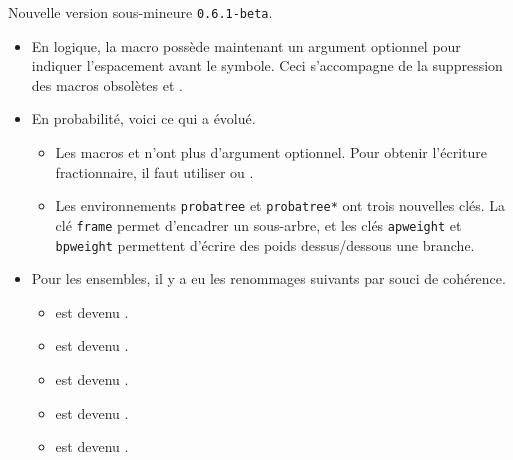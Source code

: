 Nouvelle version sous-mineure \verb+0.6.1-beta+.

\begin{itemize}[itemsep=.5em]
    \item En logique, la macro  possède maintenant un argument optionnel pour indiquer l'espacement avant le symbole.
          Ceci s'accompagne de la suppression des macros obsolètes  et .


    \item En probabilité, voici ce qui a évolué.
    \begin{itemize}[itemsep=.5em]
        \item Les macros  et  n'ont plus d'argument optionnel. Pour obtenir l'écriture fractionnaire, il faut utiliser  ou .

        \item Les environnements \verb+probatree+ et \verb+probatree*+ ont trois nouvelles clés.
              La clé \verb+frame+ permet d'encadrer un sous-arbre, et les clés \verb+apweight+ et \verb+bpweight+ permettent d'écrire des poids dessus/dessous une branche.
    \end{itemize}


    \item Pour les ensembles, il y a eu les renommages suivants par souci de cohérence.
    \begin{itemize}[itemsep=.5em]
        \item {} est devenu .

        \item {} est devenu .

        \item {} est devenu .

        \item {} est devenu .

        \item {} est devenu .
    \end{itemize}
\end{itemize}
